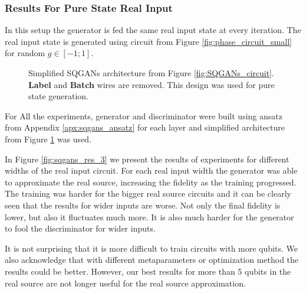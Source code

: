 \subsubsection{Results For Pure State Real Input}
In this setup the generator is fed the same real input state at every iteration.
The real input state is generated using circuit from Figure
\ref{fig:phase_circuit_small} for random $g \in [-1; 1]$.


\begin{figure}[htbp!]
  \caption{Simplified SQGANs architecture from Figure \ref{fig:SQGANs_circuit}. \textbf{Label} and
    \textbf{Batch} wires are removed. This design was used for pure state
    generation. \label{fig:SQGANs_circuit_simple}}
\end{figure}

For All
the experiments, generator and discriminator were built using ansatz
from Appendix \ref{apx:sqgans_ansatz} for each layer and simplified architecture
from Figure \ref{fig:SQGANs_circuit_simple} was used.

In Figure \ref{fig:sqgans_res_3} we present the
results of experiments for different widths of the real input circuit. 
For each real input width the generator was able to approximate the real source,
increasing the fidelity as the training progressed. The training was
harder for the bigger real source circuits and it can be clearly seen that
the results for wider inputs are worse. Not only the final fidelity is lower, but
also it fluctuates much more. It is also much harder for the generator to fool
the discriminator for wider inputs.

It is not surprising that it is more difficult to train circuits with more
qubits. We also acknowledge that with different metaparameters or optimization
method the results could be better. However, our best results for more than 5 qubits
in the real source are not longer useful for the real source approximation.

